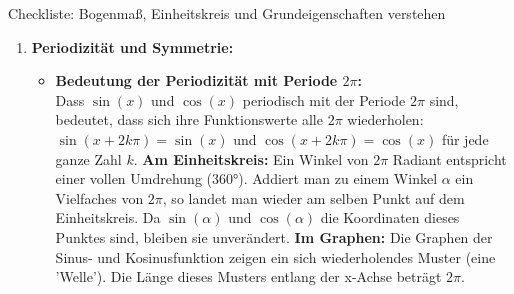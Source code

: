 \begin{loesungsumgebung}{Checkliste: Bogenmaß, Einheitskreis und Grundeigenschaften verstehen}
\begin{enumerate}[label=(\alph*)]
\begin{itemize}
        \item \textbf{Erklärung des Wertebereichs $[-1, 1]$:} \\
        Da der Einheitskreis den Radius 1 hat und sein Mittelpunkt im Ursprung liegt, können die x-Koordinaten und y-Koordinaten der Punkte auf diesem Kreis nicht kleiner als -1 und nicht größer als 1 sein.
        Da $\cos(\alpha)$ die x-Koordinate und $\sin(\alpha)$ die y-Koordinate eines Punktes auf dem Einheitskreis ist, gilt:
        $-1 \le \cos(\alpha) \le 1$
        $-1 \le \sin(\alpha) \le 1$
        Der Wertebereich von $\sin(x)$ und $\cos(x)$ ist daher jeweils das abgeschlossene Intervall $\mathbf{[-1, 1]}$.

        \item \textbf{Herleitung $\sin^2(x) + \cos^2(x) = 1$ (Trigonometrischer Pythagoras):} \\
        Die Gleichung des Einheitskreises lautet $x_P^2 + y_P^2 = r^2$. Mit $r=1$ ist dies $x_P^2 + y_P^2 = 1$.
        Da $x_P = \cos(x)$ und $y_P = \sin(x)$, können wir diese Definitionen in die Kreisgleichung einsetzen:
        $(\cos x)^2 + (\sin x)^2 = 1$.
        Dies wird üblicherweise als $\mathbf{\sin^2(x) + \cos^2(x) = 1}$ geschrieben und wird als 'Trigonometrischer Pythagoras' bezeichnet, da es direkt aus dem Satz des Pythagoras in dem rechtwinkligen Dreieck resultiert, das durch den Punkt $P$ auf dem Einheitskreis, den Ursprung und die Projektion von $P$ auf die x-Achse gebildet wird (Hypotenuse ist der Radius 1, die Katheten haben die Längen $|\cos x|$ und $|\sin x|$).
    \end{itemize}

    \item \textbf{Periodizität und Symmetrie:}
    \begin{itemize}
        \item \textbf{Bedeutung der Periodizität mit Periode $2\pi$:} \\
        Dass $\sin(x)$ und $\cos(x)$ periodisch mit der Periode $2\pi$ sind, bedeutet, dass sich ihre Funktionswerte alle $2\pi$ wiederholen:
        $\sin(x + 2k\pi) = \sin(x)$ und $\cos(x + 2k\pi) = \cos(x)$ für jede ganze Zahl $k$.
        \textbf{Am Einheitskreis:} Ein Winkel von $2\pi$ Radiant entspricht einer vollen Umdrehung (360°). Addiert man zu einem Winkel $\alpha$ ein Vielfaches von $2\pi$, so landet man wieder am selben Punkt auf dem Einheitskreis. Da $\sin(\alpha)$ und $\cos(\alpha)$ die Koordinaten dieses Punktes sind, bleiben sie unverändert.
        \textbf{Im Graphen:} Die Graphen der Sinus- und Kosinusfunktion zeigen ein sich wiederholendes Muster (eine 'Welle'). Die Länge dieses Musters entlang der x-Achse beträgt $2\pi$.


\end{itemize}
\end{enumerate}
\end{loesungsumgebung}
